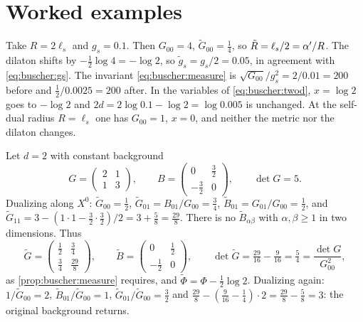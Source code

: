 \section{Worked examples}\label{sec:buscher:examples}

\begin{example}\label{ex:buscher:circle}
Take $R=2\ell_s$ and $g_s=0.1$. Then $G_{00}=4$, $\tilde G_{00}=\frac14$, so
$\tilde R=\ell_s/2=\alpha'/R$. The dilaton shifts by $-\frac12\log4=-\log2$, so
$\tilde g_s=g_s/2=0.05$, in agreement with \eqref{eq:buscher:gs}. The invariant
\eqref{eq:buscher:measure} is $\sqrt{G_{00}}/g_s^2=2/0.01=200$ before and
$\frac12/0.0025=200$ after. In the variables of \eqref{eq:buscher:twod}, $x=\log2$ goes to
$-\log2$ and $2d=2\log0.1-\log2=\log0.005$ is unchanged. At the self-dual radius $R=\ell_s$
one has $G_{00}=1$, $x=0$, and neither the metric nor the dilaton changes.
\end{example}

\begin{example}\label{ex:buscher:numbers}
Let $d=2$ with constant background
\[
 G=\begin{pmatrix}2&1\\1&3\end{pmatrix},\qquad
 B=\begin{pmatrix}0&\frac32\\-\frac32&0\end{pmatrix},\qquad\det G=5 .
\]
Dualizing along $X^0$: $\tilde G_{00}=\frac12$, $\tilde G_{01}=B_{01}/G_{00}=\frac34$,
$\tilde B_{01}=G_{01}/G_{00}=\frac12$, and
$\tilde G_{11}=3-(1\cdot1-\frac32\cdot\frac32)/2=3+\frac58=\frac{29}{8}$. There is no
$\tilde B_{\alpha\beta}$ with $\alpha,\beta\ge1$ in two dimensions. Thus
\[
 \tilde G=\begin{pmatrix}\frac12&\frac34\\[2pt]\frac34&\frac{29}{8}\end{pmatrix},\qquad
 \tilde B=\begin{pmatrix}0&\frac12\\-\frac12&0\end{pmatrix},\qquad
 \det\tilde G=\tfrac{29}{16}-\tfrac{9}{16}=\tfrac54=\frac{\det G}{G_{00}^2},
\]
as \cref{prop:buscher:measure} requires, and $\tilde\Phi=\Phi-\frac12\log2$. Dualizing
again: $1/\tilde G_{00}=2$, $\tilde B_{01}/\tilde G_{00}=1$,
$\tilde G_{01}/\tilde G_{00}=\frac32$ and
$\frac{29}{8}-(\frac{9}{16}-\frac14)\cdot2=\frac{29}{8}-\frac58=3$: the original background
returns.
\end{example}

